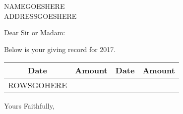 \documentclass{letter}
\begin{document}
\begin{letter}{NAMEGOESHERE \\ ADDRESSGOESHERE}
\opening{Dear Sir or Madam:}
Below is your giving record for 2017.

\begin{center}
  \begin{tabular}{|cr|cr|}
    \hline
    Date & Amount & Date & Amount \\
    \hline
    ROWSGOHERE
    \hline
  \end{tabular}
\end{center}

\closing{Yours Faithfully,}
\end{letter}
\end{document}
